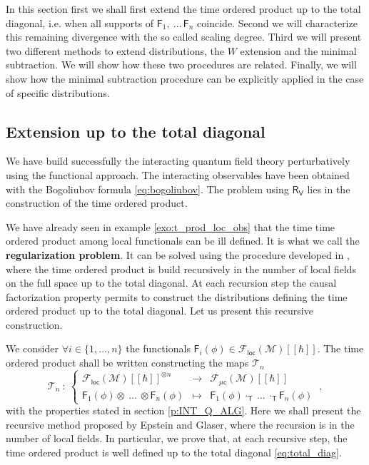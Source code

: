 \documentclass[11pt]{book}
\newcommand{\loc}{\mathsf{loc}}
\newcommand{\muc}{\mu\csf}
\newcommand{\Fcal}{\mathcal{F}}
\newcommand{\Mcal}{\mathcal{M}}
\newcommand{\Tcal}{\mathcal{T}}
\newcommand{\Fsf}{\mathsf{F}}
\newcommand{\Rsf}{\mathsf{R}}
\newcommand{\Tsf}{\mathsf{T}}
\newcommand{\Vsf}{\mathsf{V}}
\newcommand{\csf}{\mathsf{c}}
\theoremstyle{break}
\begin{document}
In this section first we shall first extend the time ordered product up to the total diagonal, i.e. when all supports of $\Fsf_1, \ ... \, \Fsf_n$ coincide. Second we will characterize this remaining divergence with the so called scaling degree. Third we will present two different methods to extend distributions, the $W$ extension and the minimal subtraction. We will show how these two procedures are related. Finally, we will show how the minimal subtraction procedure can be explicitly applied in the case of specific distributions.


\subsection{Extension up to the total diagonal}
\label{p:EXT_UP_TOT}


We have build successfully the interacting quantum field theory perturbatively using the functional approach. The interacting observables have been obtained with the Bogoliubov formula \eqref{eq:bogoliubov}. The problem using $\Rsf_\Vsf$ lies in the construction of the time ordered product.


We have already seen in example \ref{exo:t_prod_loc_obs} that the time time ordered product among local functionals can be ill defined. It is what we call the \textbf{regularization problem}. It can be solved using the procedure developed in \cite{brunetti_microlocal_2000}, where the time ordered product is build recursively in the number of local fields on the full space up to the total diagonal. At each recursion step the causal factorization property permits to construct the distributions defining the time ordered product up to the total diagonal. Let us present this recursive construction. 


\bigskip


We consider $\forall i \in \{1,\dots,n\}$ the functionals $\Fsf_i(\phi) \in \Fcal_\loc(\Mcal)[[\hbar]]$. The time ordered product shall be written constructing the maps $\Tcal_n$ 
%
\begin{equation*}
\Tcal_n \ : \ 
\left\{
\begin{array}{lcl}
\Fcal_{\loc}(\Mcal)[[\hbar]]^{\otimes n} & \to & \Fcal_{\muc}(\Mcal)[[\hbar]] \\
\Fsf_1(\phi) \otimes \ ... \ \otimes \Fsf_n(\phi) & \mapsto & \Fsf_1(\phi) \cdot_{\Tsf} \ ... \ \cdot_{\Tsf} \Fsf_n(\phi)
\end{array}
\right. \ ,
\end{equation*}
%
with the properties stated in section \ref{p:INT_Q_ALG}. Here we shall present the recursive method proposed by Epstein and Glaser, where the recursion is in the number of local fields. In particular, we prove that, at each recursive step, the time ordered product is well defined up to the total diagonal \eqref{eq:total_diag}.
\end{document}
